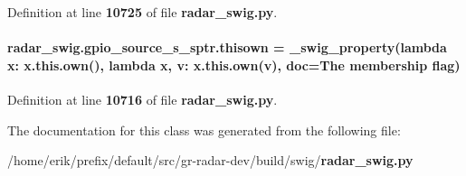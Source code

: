 Definition at line {\bf 10725} of file {\bf radar\+\_\+swig.\+py}.

\paragraph[{thisown}]{\setlength{\rightskip}{0pt plus 5cm}radar\+\_\+swig.\+gpio\+\_\+source\+\_\+s\+\_\+sptr.\+thisown = {\bf \+\_\+swig\+\_\+property}(lambda x\+: x.\+this.\+own(), lambda {\bf x}, v\+: x.\+this.\+own(v), doc=\textquotesingle{}The membership flag\textquotesingle{})\hspace{0.3cm}{\ttfamily [static]}}\label{classradar__swig_1_1gpio__source__s__sptr_a656b40e980756341c0b74d4db6cdcfee}


Definition at line {\bf 10716} of file {\bf radar\+\_\+swig.\+py}.



The documentation for this class was generated from the following file\+:\begin{DoxyCompactItemize}
\item 
/home/erik/prefix/default/src/gr-\/radar-\/dev/build/swig/{\bf radar\+\_\+swig.\+py}\end{DoxyCompactItemize}
